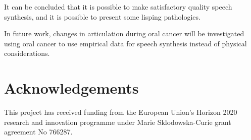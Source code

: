 \documentclass[a4paper]{article}
\begin{document}
It can be concluded that it is possible to make satisfactory quality
speech synthesis, and it is possible to present some lisping pathologies.

In future work, changes in articulation during oral cancer will be
investigated using oral cancer to use empirical data for speech synthesis
instead of physical considerations.

\section{Acknowledgements}
This project has received funding from the European Union's Horizon
2020 research and innovation programme under Marie Sklodowska-Curie
grant agreement No 766287.






\end{document}

